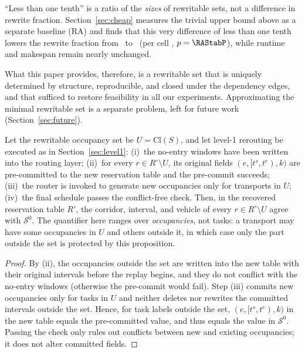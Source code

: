 \begin{remark}
``Less than one tenth'' is a ratio of the \emph{sizes} of rewritable sets, not a difference in rewrite fraction.
Section~\ref{sec:cheap} measures the trivial upper bound above as a separate baseline (RA) and finds that this very difference of less than one tenth
lowers the rewrite fraction from \ResFracAllFuture\ to \ResFracCheapRtwo\ (per cell \RAStabWTL,
\(p=\RAStabP\)), while runtime and makespan remain nearly unchanged.

What this paper provides, therefore, is a rewritable set that is uniquely determined by structure, reproducible, and closed under the dependency edges,
and that sufficed to restore feasibility in all our experiments. Approximating the minimal rewritable set is a separate problem, left for future work
(Section~\ref{sec:future}).
\end{remark}

\begin{prop}
\label{prop:outside}
Let the rewritable occupancy set be \(U=\mathrm{Cl}(S)\), and let level-1 rerouting be executed as in Section~\ref{sec:level1}:
(i)~the no-entry windows have been written into the routing layer; (ii)~for every \(r\in R^{\circ}\setminus U\), its original fields
\((e,[t^s,t^e),k)\) are pre-committed to the new reservation table and the pre-commit succeeds;
(iii)~the router is invoked to generate new occupancies only for transports in \(U\); (iv)~the final schedule passes the conflict-free check.
Then, in the recovered reservation table \(R'\), the corridor, interval, and vehicle of every \(r\in R^{\circ}\setminus U\) agree with
\(\mathcal{S}^0\). The quantifier here ranges over \emph{occupancies}, not tasks: a transport may have some occupancies in \(U\)
and others outside it, in which case only the part outside the set is protected by this proposition.
\end{prop}

\begin{proof}
By (ii), the occupancies outside the set are written into the new table with their original intervals before the replay begins, and they do not conflict with the no-entry windows
(otherwise the pre-commit would fail). Step (iii) commits new occupancies only for tasks in \(U\) and neither deletes nor rewrites the committed
intervals outside the set. Hence, for task labels outside the set, \((e,[t^s,t^e),k)\) in the new table equals the pre-committed value,
and thus equals the value in \(\mathcal{S}^0\). Passing the check only rules out conflicts between new and existing occupancies; it does not alter committed fields.
\end{proof}

